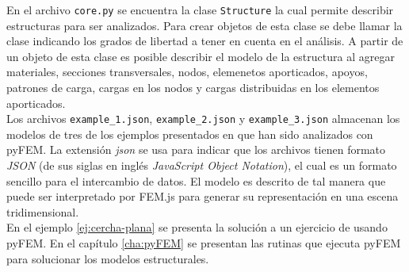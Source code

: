En el archivo \verb|core.py| se encuentra la clase \verb|Structure| la cual permite describir estructuras para ser analizados. Para crear objetos de esta clase se debe llamar la clase indicando los grados de libertad a tener en cuenta en el análisis. A partir de un objeto de esta clase es posible describir el modelo de la estructura al agregar materiales, secciones transversales, nodos, elemenetos aporticados, apoyos, patrones de carga, cargas en los nodos y cargas distribuidas en los elementos aporticados.\\

Los archivos \verb|example_1.json|, \verb|example_2.json| y \verb|example_3.json| almacenan los modelos de tres de los ejemplos presentados en \cite{escamilla1995microcomputadores} que han sido analizados con pyFEM. La extensión \emph{json} se usa para indicar que los archivos tienen formato \emph{JSON} (de sus siglas en inglés \emph{JavaScript Object Notation}), el cual es un formato sencillo para el intercambio de datos. El modelo es descrito de tal manera que puede ser interpretado por FEM.js para generar su representación en una escena tridimensional.\\

En el ejemplo \ref{ej:cercha-plana} se presenta la solución a un ejercicio de \cite{escamilla1995microcomputadores} usando pyFEM. En el capítulo \ref{cha:pyFEM} se presentan las rutinas que ejecuta pyFEM para solucionar los modelos estructurales.\\

